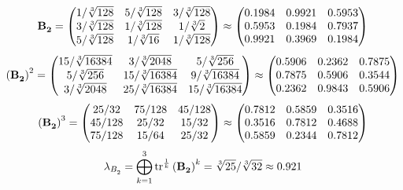 \documentclass[10pt,a4paper]{article}
\begin{document}
	\[
		\bold{B_2^{}} = 
		\begin{pmatrix}
			{1} / {\sqrt[3]{128}} & {{5}} / {\sqrt[3]{128}} & {{3}} / {\sqrt[3]{128}} \\
			{{3}} / {\sqrt[3]{128}} & {1} / {\sqrt[3]{128}} & {1} / {\sqrt[3]{2}} \\
			{{5}} / {\sqrt[3]{128}} & {1} / {\sqrt[3]{16}} & {1} / {\sqrt[3]{128}} \\
		\end{pmatrix}
		\approx
		\begin{pmatrix}
			0.1984   & 0.9921   & 0.5953   \\
			0.5953   & 0.1984   & 0.7937   \\
			0.9921   & 0.3969   & 0.1984   \\
		\end{pmatrix}
	\]
	\[
		\left(\bold{B_2^{}}\right)^{2} = 
		\begin{pmatrix}
			{{15}} / {\sqrt[3]{16384}} & {{3}} / {\sqrt[3]{2048}} & {{5}} / {\sqrt[3]{256}} \\
			{{5}} / {\sqrt[3]{256}} & {{15}} / {\sqrt[3]{16384}} & {{9}} / {\sqrt[3]{16384}} \\
			{{3}} / {\sqrt[3]{2048}} & {{25}} / {\sqrt[3]{16384}} & {{15}} / {\sqrt[3]{16384}} \\
		\end{pmatrix}
		\approx
		\begin{pmatrix}
			0.5906   & 0.2362   & 0.7875   \\
			0.7875   & 0.5906   & 0.3544   \\
			0.2362   & 0.9843   & 0.5906   \\
		\end{pmatrix}
	\]
	\[
		\left(\bold{B_2^{}}\right)^{3} = 
		\begin{pmatrix}
			{{25}} / {{32}} & {{75}} / {{128}} & {{45}} / {{128}} \\
			{{45}} / {{128}} & {{25}} / {{32}} & {{15}} / {{32}} \\
			{{75}} / {{128}} & {{15}} / {{64}} & {{25}} / {{32}} \\
		\end{pmatrix}
		\approx
		\begin{pmatrix}
			0.7812   & 0.5859   & 0.3516   \\
			0.3516   & 0.7812   & 0.4688   \\
			0.5859   & 0.2344   & 0.7812   \\
		\end{pmatrix}
	\]
	\[
		\lambda_{B_2^{}} =  \bigoplus ^{3} _{k = 1} \operatorname{tr} ^{\frac 1 k} \left( \bold{B_2^{}} \right)^k = {\sqrt[3]{25}} / {\sqrt[3]{32}}\approx 0.921
	\]
\end{document}
